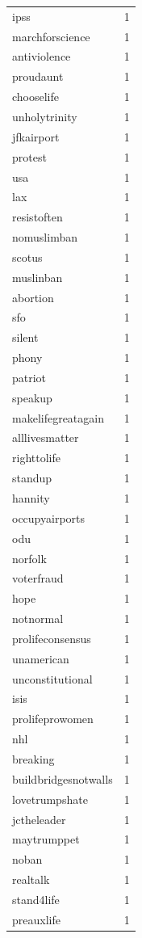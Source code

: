 \begin{tabular}{lr}
ipss & 1 \\
marchforscience & 1 \\
antiviolence & 1 \\
proudaunt & 1 \\
chooselife & 1 \\
unholytrinity & 1 \\
jfkairport & 1 \\
protest & 1 \\
usa & 1 \\
lax & 1 \\
resistoften & 1 \\
nomuslimban & 1 \\
scotus & 1 \\
muslinban & 1 \\
abortion & 1 \\
sfo & 1 \\
silent & 1 \\
phony & 1 \\
patriot & 1 \\
speakup & 1 \\
makelifegreatagain & 1 \\
alllivesmatter & 1 \\
righttolife & 1 \\
standup & 1 \\
hannity & 1 \\
occupyairports & 1 \\
odu & 1 \\
norfolk & 1 \\
voterfraud & 1 \\
hope & 1 \\
notnormal & 1 \\
prolifeconsensus & 1 \\
unamerican & 1 \\
unconstitutional & 1 \\
isis & 1 \\
prolifeprowomen & 1 \\
nhl & 1 \\
breaking & 1 \\
buildbridgesnotwalls & 1 \\
lovetrumpshate & 1 \\
jctheleader & 1 \\
maytrumppet & 1 \\
noban & 1 \\
realtalk & 1 \\
stand4life & 1 \\
preauxlife & 1 \\

\end{tabular}
